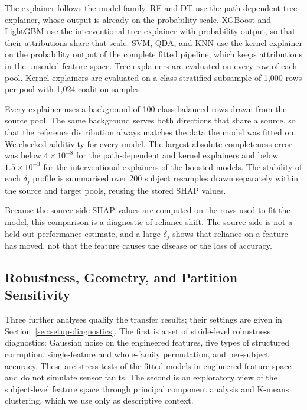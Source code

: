 \documentclass[conference]{IEEEtran}
\begin{document}
The explainer follows the model family. RF and DT use the path-dependent tree explainer, whose output is already on the probability scale. XGBoost and LightGBM use the interventional tree explainer with probability output, so that their attributions share that scale. SVM, QDA, and KNN use the kernel explainer on the probability output of the complete fitted pipeline, which keeps attributions in the unscaled feature space. Tree explainers are evaluated on every row of each pool. Kernel explainers are evaluated on a class-stratified subsample of 1{,}000 rows per pool with 1{,}024 coalition samples.

Every explainer uses a background of 100 class-balanced rows drawn from the source pool. The same background serves both directions that share a source, so that the reference distribution always matches the data the model was fitted on. We checked additivity for every model. The largest absolute completeness error was below $4\times10^{-8}$ for the path-dependent and kernel explainers and below $1.5\times10^{-3}$ for the interventional explainers of the boosted models. The stability of each $\delta_j$ profile is summarised over 200 subject resamples drawn separately within the source and target pools, reusing the stored SHAP values.

Because the source-side SHAP values are computed on the rows used to fit the model, this comparison is a diagnostic of reliance shift. The source side is not a held-out performance estimate, and a large $\delta_j$ shows that reliance on a feature has moved, not that the feature causes the disease or the loss of accuracy.

\subsection{Robustness, Geometry, and Partition Sensitivity}
\label{sec:method-diagnostics}
Three further analyses qualify the transfer results; their settings are given in Section~\ref{sec:setup-diagnostics}. The first is a set of stride-level robustness diagnostics: Gaussian noise on the engineered features, five types of structured corruption, single-feature and whole-family permutation, and per-subject accuracy. These are stress tests of the fitted models in engineered feature space and do not simulate sensor faults. The second is an exploratory view of the subject-level feature space through principal component analysis and K-means clustering, which we use only as descriptive context.
\end{document}
